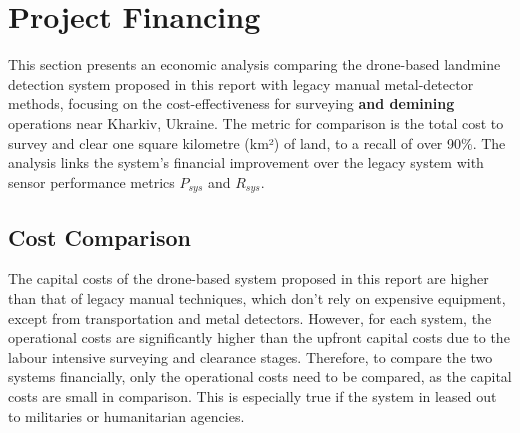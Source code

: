 \newpage
{}
\section{Project Financing} \label{financing}

This section presents an economic analysis comparing the drone-based landmine detection system proposed in this report with legacy manual metal-detector methods, focusing on the cost-effectiveness for surveying \textbf{and demining} operations near Kharkiv, Ukraine. The metric for comparison is the total cost to survey and clear one square kilometre (km²) of land, to a recall of over 90\%. The analysis links the system's financial improvement over the legacy system with sensor performance metrics $P_{sys}$ and $R_{sys}$.


\subsection{Cost Comparison} \label{subsec:cost_structures}

The capital costs of the drone-based system proposed in this report are higher than that of legacy manual techniques, which don't rely on expensive equipment, except from transportation and metal detectors. However, for each system, the operational costs are significantly higher than the upfront capital costs due to the labour intensive surveying and clearance stages. Therefore, to compare the two systems financially, only the operational costs need to be compared, as the capital costs are small in comparison. This is especially true if the system in leased out to militaries or humanitarian agencies.

